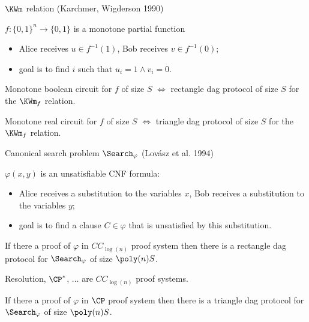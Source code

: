 \begin{frame}{$\KWm$ relation (Karchmer, Wigderson 1990)}

    $f:\{0, 1\}^n \to \{0, 1\}$ is a monotone partial function
    
    \begin{itemize}
        \item Alice receives $u \in f^{-1}(1)$, Bob receives $v \in f^{-1}(0)$;
        \item goal is to find $i$ such that $u_i = 1 \land v_i = 0$.
    \end{itemize}

    \pause

    \begin{theorem}
        Monotone boolean circuit for $f$ of size $S$ $\Leftrightarrow$ rectangle dag protocol of size $S$
        for the $\KWm_f$ relation.
    \end{theorem}

    \pause

    \begin{theorem}
        Monotone real circuit for $f$ of size $S$ $\Leftrightarrow$ triangle dag protocol of size $S$
        for the $\KWm_f$ relation.
    \end{theorem}
\end{frame}


\begin{frame}{Canonical search problem $\Search_{\varphi}$ (Lov{\'{a}}sz et al. 1994)}
    
    $\varphi(x, y)$ is an unsatisfiable CNF formula:
    \begin{itemize}
        \item Alice receives a substitution to the variables $x$, Bob receives a substitution to the
            variables $y$;
        \item goal is to find a clause $C \in \varphi$ that is unsatisfied by this substitution.
    \end{itemize}

    \pause

    \begin{theorem}[Kraj{\'{\i}}{\v{c}}ek 95; S 17]
        If there a proof of $\varphi$ in $CC_{\log(n)}$ proof system then there is a rectangle dag protocol for
        $\Search_{\varphi}$ of size $\poly(n) S$.
    \end{theorem}

    Resolution, $\CP^*$, $\dots$ are $CC_{\log(n)}$ proof systems.

    \pause
    
    \begin{theorem}[S 17]
        If there a proof of $\varphi$ in $\CP$ proof system then there is a triangle dag protocol for
        $\Search_{\varphi}$ of size $\poly(n) S$.
    \end{theorem}
\end{frame}


